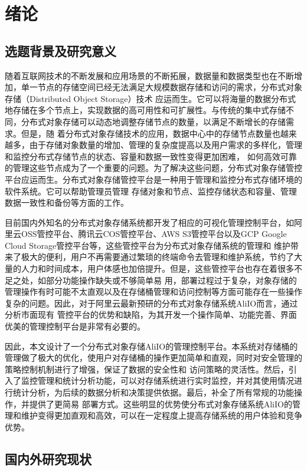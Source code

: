 \chapter{绪论}

\section{选题背景及研究意义}

随着互联网技术的不断发展和应用场景的不断拓展，数据量和数据类型也在不断增加，单一节点的存储空间已经无法满足大规模数据存储和访问的需求，分布式对象存储（Distributed Object Storage）技术
应运而生。它可以将海量的数据分布式地存储在多个节点上，实现数据的高可用性和可扩展性。与传统的集中式存储不同，分布式对象存储可以动态地调整存储节点的数量，以满足不断增长的存储需求。但是，随
着分布式对象存储技术的应用，数据中心中的存储节点数量也越来越多，由于存储对象数量的增加、管理的复杂度提高以及用户需求的多样化，管理和监控分布式存储节点的状态、容量和数据一致性变得更加困难，
如何高效可靠的管理这些节点成为了一个重要的问题。为了解决这些问题，分布式对象存储管控平台应运而生。分布式对象存储管控平台是一种用于管理和监控分布式存储环境的软件系统。它可以帮助管理员管理
存储对象和节点、监控存储状态和容量、管理数据一致性和备份等方面的工作。

目前国内外知名的分布式对象存储系统都开发了相应的可视化管理控制平台，如阿里云OSS管控平台、腾讯云COS管控平台、AWS S3管控平台以及GCP Google Cloud Storage管控平台等，这些管控平台为分布式对象存储系统的管理和
维护带来了极大的便利，用户不再需要通过繁琐的终端命令去管理和维护系统，节约了大量的人力和时间成本，用户体感也加倍提升。但是，这些管控平台也存在着很多不足之处，如部分功能操作缺失或不够简单易
用，部署过程过于复杂，对象存储的管理操作有时可能不太直观以及在存储桶管理和访问控制等方面可能存在一些操作复杂的问题。因此，对于阿里云最新预研的分布式对象存储系统AliIO而言，通过分析市面现有
管控平台的优势和缺陷，为其开发一个操作简单、功能完善、界面优美的管理控制平台是非常有必要的。

因此，本文设计了一个分布式对象存储AliIO的管理控制平台。本系统对存储桶的管理做了极大的优化，使用户对存储桶的操作更加简单和直观，同时对安全管理的策略控制机制进行了增强，保证了数据的安全性和
访问策略的灵活性。然后，引入了监控管理和统计分析功能，可以对存储系统进行实时监控，并对其使用情况进行统计分析，为后续的数据分析和决策提供依据。最后，补全了所有常规的功能操作，并提供了更简易
部署方式。这些明显的优势使分布式对象存储系统AliIO的管理和维护变得更加直观和高效，可以在一定程度上提高存储系统的用户体验和竞争优势。


\section{国内外研究现状}

